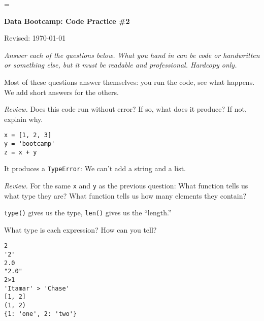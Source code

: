 \documentclass[11pt]{exam}
\begin{document}
\parskip=\bigskipamount
\parindent=0.0in
\thispagestyle{empty}


\bigskip\bigskip
\centerline{\Large \bf Data Bootcamp:  Code Practice \#2}
\centerline{Revised: \today}

\medskip
{\it Answer each of the questions below.
What you hand in can be code or handwritten or something else,
but it must be readable and professional.
Hardcopy only.}

\begin{solution}
Most of these questions answer themselves:  you run the code,
see what happens.  We add short answers for the others.
\end{solution}

\begin{questions}
\item {\it Review.\/} Does this code run without error? If so, what does it produce?  If not, explain why.
\begin{verbatim}
x = [1, 2, 3]
y = 'bootcamp'
z = x + y
\end{verbatim}

\begin{solution}
It produces a {\tt TypeError}:  We can't add a string and a list.
\end{solution}

\item {\it Review.\/} For the same {\tt x} and {\tt y} as the previous question:
What function tells us what type they are?
What function tells us how many elements they contain?

\begin{solution}
{\tt type()} gives us the type, {\tt len()} gives us the ``length.''
\end{solution}



\item What type is each expression?  How can you tell?
\begin{verbatim}
2
'2'
2.0
"2.0"
2>1
'Itamar' > 'Chase'
[1, 2]
(1, 2)
{1: 'one', 2: 'two'}
\end{verbatim}


\end{questions}
\end{document}
